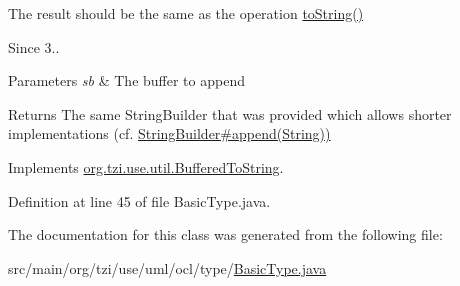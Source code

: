 The result should be the same as the operation \hyperlink{classorg_1_1tzi_1_1use_1_1uml_1_1ocl_1_1type_1_1_type_impl_a36d68452942c6f779d8c2adaaaf700f8}{to\-String()} 

\begin{DoxySince}{Since}
3.. 
\end{DoxySince}

\begin{DoxyParams}{Parameters}
{\em sb} & The buffer to append \\
\hline
\end{DoxyParams}
\begin{DoxyReturn}{Returns}
The same String\-Builder that was provided which allows shorter implementations (cf. \hyperlink{}{String\-Builder\#append(\-String))} 
\end{DoxyReturn}


Implements \hyperlink{interfaceorg_1_1tzi_1_1use_1_1util_1_1_buffered_to_string_aea95e4e53b18818d50ee253700e6e2d5}{org.\-tzi.\-use.\-util.\-Buffered\-To\-String}.



Definition at line 45 of file Basic\-Type.\-java.



The documentation for this class was generated from the following file\-:\begin{DoxyCompactItemize}
\item 
src/main/org/tzi/use/uml/ocl/type/\hyperlink{_basic_type_8java}{Basic\-Type.\-java}\end{DoxyCompactItemize}

